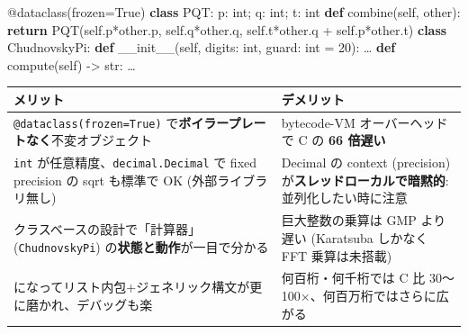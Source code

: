 \documentclass[
]{ltjsarticle}
\newenvironment{Shaded}{}{}
\newcommand{\AttributeTok}[1]{\textcolor[rgb]{0.49,0.56,0.16}{#1}}
\newcommand{\BuiltInTok}[1]{\textcolor[rgb]{0.00,0.50,0.00}{#1}}
\newcommand{\ControlFlowTok}[1]{\textcolor[rgb]{0.00,0.44,0.13}{\textbf{#1}}}
\newcommand{\DecValTok}[1]{\textcolor[rgb]{0.25,0.63,0.44}{#1}}
\newcommand{\FunctionTok}[1]{\textcolor[rgb]{0.02,0.16,0.49}{#1}}
\newcommand{\KeywordTok}[1]{\textcolor[rgb]{0.00,0.44,0.13}{\textbf{#1}}}
\newcommand{\NormalTok}[1]{#1}
\newcommand{\OperatorTok}[1]{\textcolor[rgb]{0.40,0.40,0.40}{#1}}
\newcommand{\VariableTok}[1]{\textcolor[rgb]{0.10,0.09,0.49}{#1}}
\newcounter{none} %
\begin{document}
\begin{Shaded}
\begin{Highlighting}[]
\AttributeTok{@dataclass}\NormalTok{(frozen}\OperatorTok{=}\VariableTok{True}\NormalTok{)}
\KeywordTok{class}\NormalTok{ PQT:}
\NormalTok{    p: }\BuiltInTok{int}\OperatorTok{;}\NormalTok{ q: }\BuiltInTok{int}\OperatorTok{;}\NormalTok{ t: }\BuiltInTok{int}
    \KeywordTok{def}\NormalTok{ combine(}\VariableTok{self}\NormalTok{, other): }\ControlFlowTok{return}\NormalTok{ PQT(}\VariableTok{self}\NormalTok{.p}\OperatorTok{*}\NormalTok{other.p, }\VariableTok{self}\NormalTok{.q}\OperatorTok{*}\NormalTok{other.q,}
                                          \VariableTok{self}\NormalTok{.t}\OperatorTok{*}\NormalTok{other.q }\OperatorTok{+} \VariableTok{self}\NormalTok{.p}\OperatorTok{*}\NormalTok{other.t)}
\KeywordTok{class}\NormalTok{ ChudnovskyPi:}
    \KeywordTok{def} \FunctionTok{\_\_init\_\_}\NormalTok{(}\VariableTok{self}\NormalTok{, digits: }\BuiltInTok{int}\NormalTok{, guard: }\BuiltInTok{int} \OperatorTok{=} \DecValTok{20}\NormalTok{): …}
    \KeywordTok{def}\NormalTok{ compute(}\VariableTok{self}\NormalTok{) }\OperatorTok{{-}\textgreater{}} \BuiltInTok{str}\NormalTok{: …}
\end{Highlighting}
\end{Shaded}

{\def\LTcaptype{none} %
\begin{longtable}[]{@{}
  >{\raggedright\arraybackslash}p{}
  >{\raggedright\arraybackslash}p{}@{}}
\toprule\noalign{}
\begin{minipage}[b]{\linewidth}\raggedright
メリット
\end{minipage} & \begin{minipage}[b]{\linewidth}\raggedright
デメリット
\end{minipage} \\
\midrule\noalign{}
\endhead
\bottomrule\noalign{}
\endlastfoot
\texttt{@dataclass(frozen=True)}
で\textbf{ボイラープレートなく}不変オブジェクト & bytecode-VM
オーバーヘッドで C の \textbf{66 倍遅い} \\
\texttt{int} が任意精度、\texttt{decimal.Decimal} で fixed precision の
sqrt も標準で OK (外部ライブラリ無し) & Decimal の context (precision)
が\textbf{スレッドローカルで暗黙的}: 並列化したい時に注意 \\
クラスベースの設計で「計算器」 (\texttt{ChudnovskyPi})
の\textbf{状態と動作}が一目で分かる & 巨大整数の乗算は GMP より遅い
(Karatsuba しかなく FFT 乗算は未搭載) \\
3.14 になってリスト内包+ジェネリック構文が更に磨かれ、デバッグも楽 &
何百桁・何千桁では C 比 30〜100×、何百万桁ではさらに広がる \\
\end{longtable}
}
\end{document}
